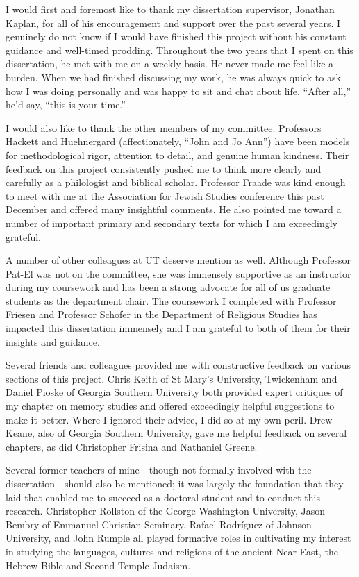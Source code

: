 
I would first and foremost like to thank my dissertation supervisor, Jonathan Kaplan, for all of his encouragement and support over the past several years. I genuinely do not know if I would have finished this project without his constant guidance and well-timed prodding. Throughout the two years that I spent on this dissertation, he met with me on a weekly basis. He never made me feel like a burden. When we had finished discussing my work, he was always quick to ask how I was doing personally and was happy to sit and chat about life. ``After all,'' he'd say, ``this is your time.''

I would also like to thank the other members of my committee. Professors Hackett and Huehnergard (affectionately, ``John and Jo Ann'') have been models for methodological rigor, attention to detail, and genuine human kindness. Their feedback on this project consistently pushed me to think more clearly and carefully as a philologist and biblical scholar. Professor Fraade was kind enough to meet with me at the Association for Jewish Studies conference this past December and offered many insightful comments. He also pointed me toward a number of important primary and secondary texts for which I am exceedingly grateful.

A number of other colleagues at UT deserve mention as well. Although Professor Pat-El was not on the committee, she was immensely supportive as an instructor during my coursework and has been a strong advocate for all of us graduate students as the department chair. The coursework I completed with Professor Friesen and Professor Schofer in the Department of Religious Studies has impacted this dissertation immensely and I am grateful to both of them for their insights and guidance.

Several friends and colleagues provided me with constructive feedback on various sections of this project. Chris Keith of St Mary's University, Twickenham and Daniel Pioske of Georgia Southern University both provided expert critiques of my chapter on memory studies and offered exceedingly helpful suggestions to make it better. Where I ignored their advice, I did so at my own peril. Drew Keane, also of Georgia Southern University, gave me helpful feedback on several chapters, as did Christopher Frisina and Nathaniel Greene.

Several former teachers of mine---though not formally involved with the dissertation---should also be mentioned; it was largely the foundation that they laid that enabled me to succeed as a doctoral student and to conduct this research. Christopher Rollston of the George Washington University, Jason Bembry of Emmanuel Christian Seminary, Rafael Rodríguez of Johnson University, and John Rumple all played formative roles in cultivating my interest in studying the languages, cultures and religions of the ancient Near East, the Hebrew Bible and Second Temple Judaism.

